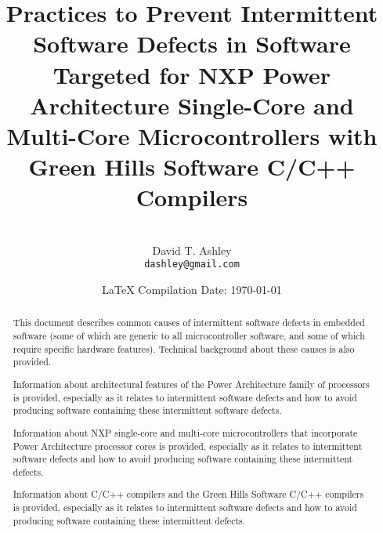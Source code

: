 \documentclass[letterpaper,10pt,titlepage]{article}
\begin{document}
\title{Practices to Prevent Intermittent Software Defects in Software Targeted for 
       NXP\textsuperscript{\textregistered}
       Power Architecture\textsuperscript{\textregistered} Single-Core and 
	   Multi-Core Microcontrollers
	   with Green Hills Software\textsuperscript{\textregistered} C/C++ Compilers}
\author{\vspace{3cm}\\David T. Ashley\\\texttt{dashley@gmail.com}\\\vspace{3cm}}
\date{\LaTeX{} Compilation Date: \today{}}
\maketitle
%
%
\begin{abstract}
This document describes common causes of intermittent software defects
in embedded software (some of which are generic to all microcontroller
software, and some of which require specific hardware features).  Technical
background about these causes is also provided.

Information about architectural features of the 
Power Architecture\textsuperscript{\textregistered} family of processors is
provided, especially as it relates to intermittent software defects and how
to avoid producing software containing these intermittent software defects.

Information about NXP\textsuperscript{\textregistered} single-core and
multi-core microcontrollers that incorporate
Power Architecture\textsuperscript{\textregistered} processor cores is provided,
especially as it relates to intermittent software defects and how to avoid
producing software containing these intermittent defects.

Information about C/C++ compilers and the 
Green Hills Software\textsuperscript{\textregistered} C/C++ compilers
is provided,
especially as it relates to intermittent software defects and how to avoid
producing software containing these intermittent defects.
\end{abstract}

\tableofcontents{}
\clearpage{}
\listoffigures{}
\listoftables{}
\clearpage{}
\end{document}
